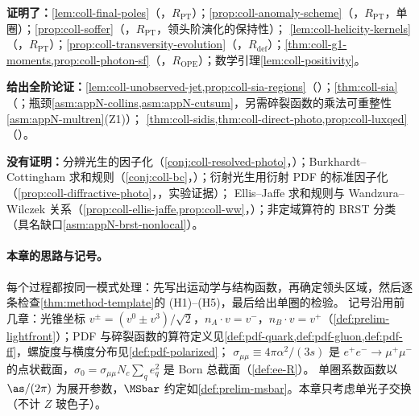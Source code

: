 \begin{tcolorbox}[enhanced,breakable,title=本章证明了什么／没有证明什么,fonttitle=\bfseries,
  colback=gray!3!white,colframe=gray!55!black,boxrule=0.6pt,arc=2pt,
  left=5pt,right=5pt,top=3pt,bottom=3pt,before skip=6pt,after skip=6pt]
\textbf{证明了：}\cref{lem:coll-final-poles}（\tagR，$R_{\mathrm{PT}}$）；\cref{prop:coll-anomaly-scheme}（\tagR，$R_{\mathrm{PT}}$，单圈）；\cref{prop:coll-soffer}（\tagR，$R_{\mathrm{PT}}$，领头阶演化的保持性）；
\cref{lem:coll-helicity-kernels}（\tagR，$R_{\mathrm{PT}}$）；\cref{prop:coll-transversity-evolution}（\tagR，$R_{\mathrm{def}}$）；\cref{thm:coll-g1-moments,prop:coll-photon-sf}（\tagR，$R_{\mathrm{OPE}}$）；数学引理\cref{lem:coll-positivity}。\par
\textbf{给出全阶论证：}\cref{lem:coll-unobserved-jet,prop:coll-sia-regions}（\tagA）；\cref{thm:coll-sia}（\tagA；瓶颈\cref{asm:appN-collins,asm:appN-cutsum}，另需碎裂函数的乘法可重整性\cref{asm:appN-multren}(Z1)）；
\cref{thm:coll-sidis,thm:coll-direct-photo,prop:coll-luxqed}（\tagA）。\par
\textbf{没有证明：}分辨光生的因子化（\cref{conj:coll-resolved-photo}，\tagC）；Burkhardt--Cottingham 求和规则（\cref{conj:coll-bc}，\tagC）；衍射光生用衍射 PDF 的标准因子化（\cref{prop:coll-diffractive-photo}，\tagV，实验证据）；
Ellis--Jaffe 求和规则与 Wandzura--Wilczek 关系（\cref{prop:coll-ellis-jaffe,prop:coll-ww}，\tagV）；非定域算符的 BRST 分类（具名缺口\cref{asm:appN-brst-nonlocal}）。
\end{tcolorbox}

\paragraph{本章的思路与记号。}
每个过程都按同一模式处理：先写出运动学与结构函数，再确定领头区域，然后逐条检查\cref{thm:method-template}的 (H1)--(H5)，最后给出单圈的检验。
记号沿用前几章：光锥坐标 $v^\pm=(v^0\pm v^3)/\sqrt2$，$n_A\cdot v=v^-$，$n_B\cdot v=v^+$（\cref{def:prelim-lightfront}）；PDF 与碎裂函数的算符定义见\cref{def:pdf-quark,def:pdf-gluon,def:pdf-ff}，螺旋度与横度分布见\cref{def:pdf-polarized}；
$\sigma_{\mu\mu}\equiv4\pi\alpha^2/(3s)$ 是 $e^+e^-\to\mu^+\mu^-$ 的点状截面，$\sigma_0=\sigma_{\mu\mu}N_c\sum_qe_q^2$ 是 Born 总截面（\cref{def:ee-R}）。%
单圈系数函数以 $\as/(2\pi)$ 为展开参数，$\MSbar$ 约定如\cref{def:prelim-msbar}。本章只考虑单光子交换（不计 $Z$ 玻色子）。
